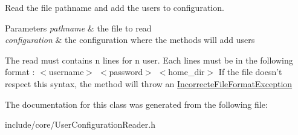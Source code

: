 Read the file pathname and add the users to configuration. 


\begin{DoxyParams}{Parameters}
{\em pathname} & the file to read \\
\hline
{\em configuration} & the configuration where the methods will add users\\
\hline
\end{DoxyParams}
The read must contains n lines for n user. Each lines must be in the following format \-: $<$username$>$ $<$password$>$ $<$home\-\_\-dir$>$ If the file doesn't respect this syntax, the method will throw an \hyperlink{class_f_t_p_1_1_incorrecte_file_format_exception}{Incorrecte\-File\-Format\-Exception} 

The documentation for this class was generated from the following file\-:\begin{DoxyCompactItemize}
\item 
include/core/User\-Configuration\-Reader.\-h\end{DoxyCompactItemize}
